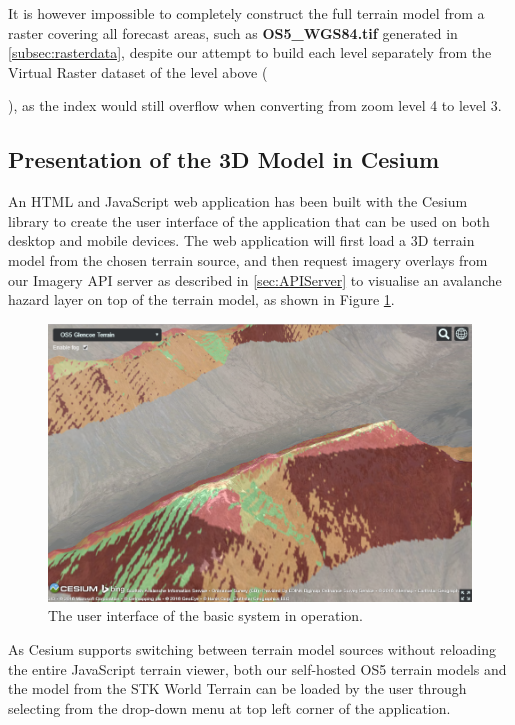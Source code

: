 \documentclass[11pt, oneside]{article}
\begin{document}
		It is however impossible to completely construct the full terrain model from a raster covering all forecast areas, such as \textbf{OS5\_WGS84.tif} generated in \ref{subsec:rasterdata}, despite our attempt to build each level separately from the Virtual Raster dataset of the level above ({), as the index would still overflow when converting from zoom level 4 to level 3.
		
	\subsection{Presentation of the 3D Model in Cesium}
		
		An HTML and JavaScript web application has been built with the Cesium library to create the user interface of the application that can be used on both desktop and mobile devices. The web application will first load a 3D terrain model from the chosen terrain source, and then request imagery overlays from our Imagery API server as described in \ref{sec:APIServer} to visualise an avalanche hazard layer on top of the terrain model, as shown in Figure \ref{fig:UI}.
		\begin{figure}[h]
		\centering
		\includegraphics[scale=0.5]{UI.png}
		\caption{\label{fig:UI}The user interface of the basic system in operation.}
		\end{figure}
		
		As Cesium supports switching between terrain model sources without reloading the entire JavaScript terrain viewer, both our self-hosted OS5 terrain models and the model from the STK World Terrain can be loaded by the user through selecting from the drop-down menu at top left corner of the application. 
		
}
\end{document}
